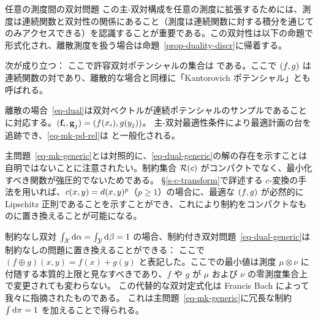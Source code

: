 


\begin{rem2}{任意の測度間の双対問題}
	この主-双対構成を任意の測度に拡張するためには、測度は連続関数と双対性の関係にあること（測度は連続関数に対する積分を通じてのみアクセスできる）を認識することが重要である。この双対性は以下の命題で形式化され、離散測度を扱う場合は命題~\ref{prop-duality-discr}に帰着する。

	\begin{prop}
	次が成り立つ：
	ここで許容双対ポテンシャルの集合は
	である。ここで $(f,g)$ は連続関数の対であり、離散的な場合と同様に「Kantorovich ポテンシャル」とも呼ばれる。
	\end{prop}

	離散の場合~\eqref{eq-dual}は双対ベクトルが連続ポテンシャルのサンプルであることに対応する。\ie $(\mathrm{\textbf{f}}_i,\mathrm{\textbf{g}}_j)=(f(x_i),g(y_j))$。
	主-双対最適性条件により最適計画の台を追跡でき、\eqref{eq-mk-pd-rel}は
	と一般化される。

	主問題~\eqref{eq-mk-generic}とは対照的に、\eqref{eq-dual-generic}の解の存在を示すことは自明ではないことに注意されたい。制約集合 $\mathcal{R}(c)$ がコンパクトでなく、最小化すべき関数が強圧的でないためである。
	\S\ref{s-c-transform}で詳述する $c$-変換の手法を用いれば、$c(x,y)=d(x,y)^p$（$p\geq 1$）の場合に、最適な $(f,g)$ が必然的に Lipschitz 正則であることを示すことができ、これにより制約をコンパクトなものに置き換えることが可能になる。
\end{rem2}

\begin{rem2}{制約なし双対}\label{rem-uncons-dual}
$\int_{\mathcal{X}} \mathrm{d}\alpha=\int_{\mathcal{Y}}\mathrm{d}\beta = 1$ の場合、制約付き双対問題~\eqref{eq-dual-generic}は制約なしの問題に置き換えることができる：
ここで $(f\oplus g)(x,y)=f(x)+g(y)$ と表記した。ここでの最小値は測度 $\mu \otimes \nu$ に付随する本質的上限と見なすべきであり、\ie $f$ や $g$ が $\mu$ および $\nu$ の零測度集合上で変更されても変わらない。
%
この代替的な双対定式化は Francis Bach によって我々に指摘されたものである。
%
これは主問題~\eqref{eq-mk-generic}に冗長な制約 $\int \mathrm{d}\pi=1$ を加えることで得られる。
\end{rem2}


